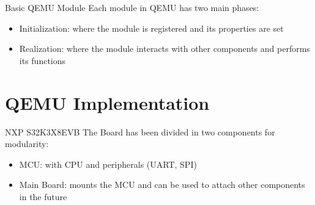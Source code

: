 \documentclass{beamer}
\begin{document}
\begin{frame}[fragile]{Basic QEMU Module}
    Each module in QEMU has two main phases:
    \begin{itemize}
        \item Initialization: where the module is registered and its properties are set
        \item Realization: where the module interacts with other components and performs its functions
    \end{itemize}
\end{frame}

\section{QEMU Implementation}

\footlinecolor{}
\begin{frame}[fragile]{NXP S32K3X8EVB}
    The Board has been divided in two components for modularity:
    \begin{itemize}
        \item MCU: with CPU and peripherals (UART, SPI)
        \item Main Board: mounts the MCU and can be used to attach other components in the future
    \end{itemize}
\end{frame}
\end{document}
